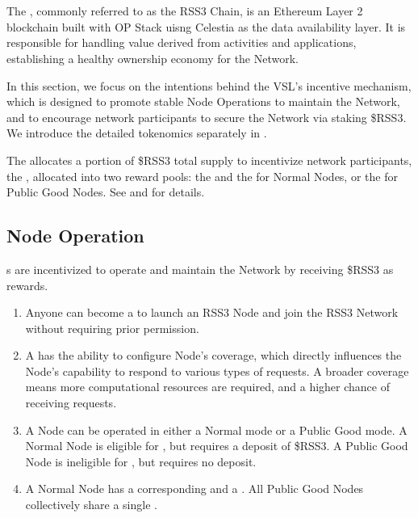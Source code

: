 \section{}
\label{sec:VSL}

The , commonly referred to as the RSS3 Chain, is an Ethereum Layer 2 blockchain built with OP Stack uisng Celestia as the data availability layer.
It is responsible for handling value derived from  activities and applications, establishing a healthy ownership economy for the Network.

In this section, we focus on the intentions behind the \gls{VSL}'s incentive mechanism, which is designed to promote stable Node Operations to maintain the Network, and to encourage network participants to secure the Network via staking \$RSS3.
We introduce the detailed tokenomics separately in .

The  allocates a portion of \$RSS3 total supply to incentivize network participants, the , 
allocated into two reward pools: the  and the  for Normal Nodes, or the  for Public Good Nodes.
See  and  for details.

\subsection{Node Operation}
s are incentivized to operate and maintain the Network by receiving \$RSS3 as rewards.
\begin{enumerate}
    \item Anyone can become a  to launch an RSS3 Node and join the RSS3 Network without requiring prior permission.
    \item A  has the ability to configure Node's coverage, which directly influences the Node's capability to respond to various types of requests. A broader coverage means more computational resources are required, and a higher chance of receiving requests.
    \item A Node can be operated in either a Normal mode or a Public Good mode. A Normal Node is eligible for , but requires a deposit of \$RSS3. A Public Good Node is ineligible for , but requires no deposit.
    \item A Normal Node has a corresponding  and a . All Public Good Nodes collectively share a single .
\end{enumerate}

